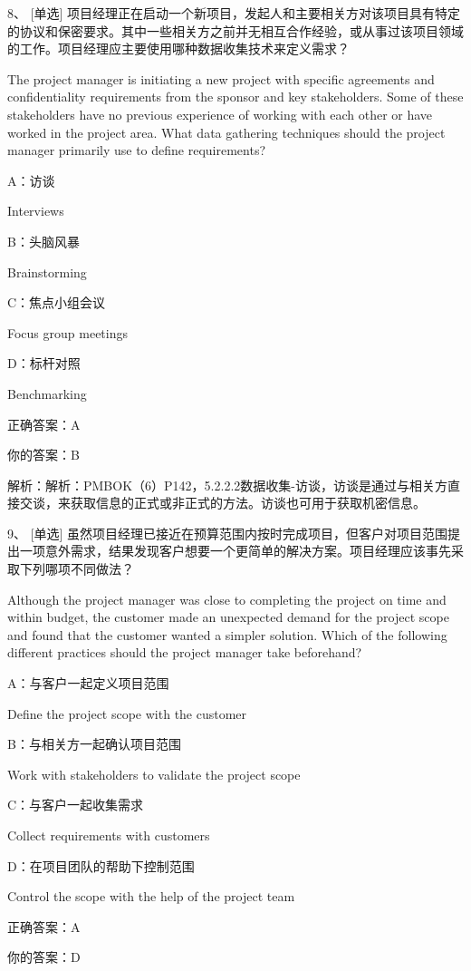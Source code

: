 8、 [单选] 项目经理正在启动一个新项目，发起人和主要相关方对该项目具有特定的协议和保密要求。其中一些相关方之前并无相互合作经验，或从事过该项目领域的工作。项目经理应主要使用哪种数据收集技术来定义需求？

The project manager is initiating a new project with specific agreements and confidentiality requirements from the sponsor and key stakeholders. Some of these stakeholders have no previous experience of working with each other or have worked in the project area. What data gathering techniques should the project manager primarily use to define requirements?

A：访谈

Interviews

B：头脑风暴

Brainstorming

C：焦点小组会议

Focus group meetings

D：标杆对照

Benchmarking

正确答案：A

你的答案：B

解析：解析：PMBOK（6）P142，5.2.2.2数据收集-访谈，访谈是通过与相关方直接交谈，来获取信息的正式或非正式的方法。访谈也可用于获取机密信息。


9、 [单选] 虽然项目经理已接近在预算范围内按时完成项目，但客户对项目范围提出一项意外需求，结果发现客户想要一个更简单的解决方案。项目经理应该事先采取下列哪项不同做法？

Although the project manager was close to completing the project on time and within budget, the customer made an unexpected demand for the project scope and found that the customer wanted a simpler solution. Which of the following different practices should the project manager take beforehand?

A：与客户一起定义项目范围

Define the project scope with the customer

B：与相关方一起确认项目范围

Work with stakeholders to validate the project scope

C：与客户一起收集需求

Collect requirements with customers

D：在项目团队的帮助下控制范围

Control the scope with the help of the project team

正确答案：A

你的答案：D


